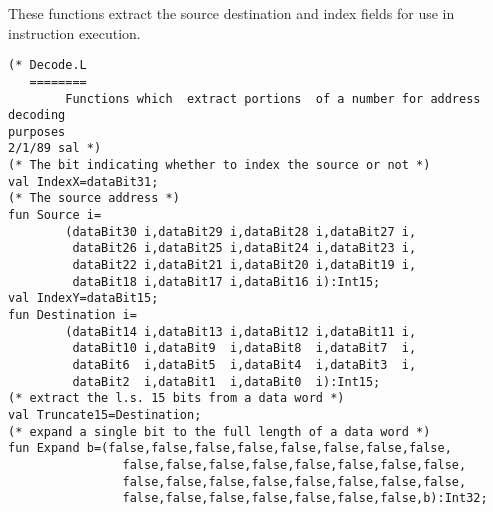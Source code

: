 These functions extract the source destination and index fields for use in instruction execution.
\begin{verbatim}
(* Decode.L
   ========
        Functions which  extract portions  of a number for address decoding
purposes 
2/1/89 sal *)
(* The bit indicating whether to index the source or not *)
val IndexX=dataBit31;
(* The source address *)
fun Source i=
        (dataBit30 i,dataBit29 i,dataBit28 i,dataBit27 i,
         dataBit26 i,dataBit25 i,dataBit24 i,dataBit23 i,
         dataBit22 i,dataBit21 i,dataBit20 i,dataBit19 i,
         dataBit18 i,dataBit17 i,dataBit16 i):Int15;
val IndexY=dataBit15;
fun Destination i=
        (dataBit14 i,dataBit13 i,dataBit12 i,dataBit11 i,
         dataBit10 i,dataBit9  i,dataBit8  i,dataBit7  i,
         dataBit6  i,dataBit5  i,dataBit4  i,dataBit3  i,
         dataBit2  i,dataBit1  i,dataBit0  i):Int15;
(* extract the l.s. 15 bits from a data word *)
val Truncate15=Destination;
(* expand a single bit to the full length of a data word *)
fun Expand b=(false,false,false,false,false,false,false,false,
                false,false,false,false,false,false,false,false,
                false,false,false,false,false,false,false,false,
                false,false,false,false,false,false,false,b):Int32;
\end{verbatim}
